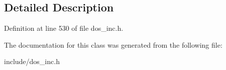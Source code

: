 \subsection{Detailed Description}


Definition at line 530 of file dos\-\_\-inc.\-h.



The documentation for this class was generated from the following file\-:\begin{DoxyCompactItemize}
\item 
include/dos\-\_\-inc.\-h\end{DoxyCompactItemize}
